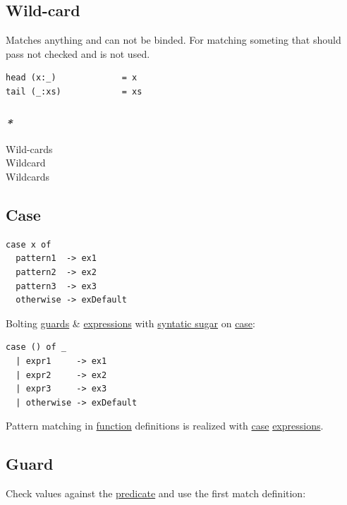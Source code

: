 \documentclass[a4paper,14pt,oneside]{book}
\begin{document}
\subsection{\label{org8b4348e}Wild-card}
\label{sec:org74bc6b1}
Matches anything and can not be binded. For matching someting that should pass not checked and is not used.\\

\begin{verbatim}
head (x:_)             = x
tail (_:xs)            = xs
\end{verbatim}

\subsubsection{\emph{*}}
\label{sec:org3bf142e}
\label{orge9aab0a}Wild-cards\\
\label{org85a0f35}Wildcard\\
\label{org81c87f3}Wildcards\\

\subsection{\label{orgbaad414}Case}
\label{sec:org2895a62}
\begin{verbatim}
case x of
  pattern1  -> ex1
  pattern2  -> ex2
  pattern3  -> ex3
  otherwise -> exDefault
\end{verbatim}

Bolting \hyperref[org72799ec]{guards} \& \hyperref[orgae6a816]{expressions} with \hyperref[orged91b0b]{syntatic sugar} on \hyperref[orgbaad414]{case}:\\
\begin{verbatim}
case () of _
  | expr1     -> ex1
  | expr2     -> ex2
  | expr3     -> ex3
  | otherwise -> exDefault
\end{verbatim}

Pattern matching in \hyperref[orge00b05b]{function} definitions is realized with \hyperref[orgbaad414]{case} \hyperref[orgae6a816]{expressions}.\\

\subsection{\label{orgc43af15}Guard}
\label{sec:org2f17f64}
Check values against the \hyperref[org87e8b2f]{predicate} and use the first match definition:\\
\end{document}
